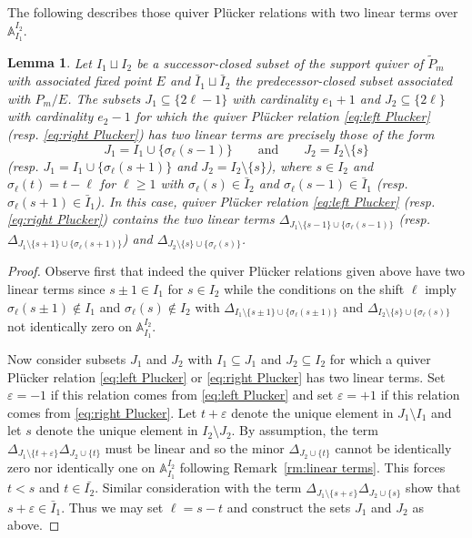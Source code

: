 \documentclass{amsart}
\newtheorem{lemma}[theorem]{Lemma}
\numberwithin{equation}{section}
\renewcommand{\AA}{\mathbb{A}}
\begin{document}
  The following describes those quiver Pl\"ucker relations with two linear terms over $\AA_{I_1}^{I_2}$.
  \begin{lemma}
    Let $I_1\sqcup I_2$ be a successor-closed subset of the support quiver of $\tilde P_m$ with associated fixed point $E$ and $\bar{I}_1\sqcup\bar{I}_2$ the predecessor-closed subset associated with $P_m/E$.
    The subsets $J_1\subseteq\{2\ell-1\}$ with cardinality $e_1+1$ and $J_2\subseteq\{2\ell\}$ with cardinality $e_2-1$ for which the quiver Pl\"ucker relation \eqref{eq:left Plucker} (resp. \eqref{eq:right Plucker}) has two linear terms are precisely those of the form
    \[J_1=I_1\cup\{\sigma_\ell(s-1)\} \qquad \text{and} \qquad J_2=I_2\setminus\{s\}\]
    (resp. $J_1=I_1\cup\{\sigma_\ell(s+1)\}$ and $J_2=I_2\setminus\{s\}$), where $s\in I_2$ and $\sigma_\ell(t)=t-\ell$ for $\ell\ge1$ with $\sigma_\ell(s)\in\bar{I}_2$ and $\sigma_\ell(s-1)\in\bar{I}_1$ (resp. $\sigma_\ell(s+1)\in\bar{I}_1$).
    In this case, quiver Pl\"ucker relation \eqref{eq:left Plucker} (resp. \eqref{eq:right Plucker}) contains the two linear terms $\Delta_{J_1\setminus\{s-1\}\cup\{\sigma_\ell(s-1)\}}$ (resp. $\Delta_{J_1\setminus\{s+1\}\cup\{\sigma_\ell(s+1)\}}$) and $\Delta_{J_2\setminus\{s\}\cup\{\sigma_\ell(s)\}}$.
  \end{lemma}
  \begin{proof}
    Observe first that indeed the quiver Pl\"ucker relations given above have two linear terms since $s\pm1\in I_1$ for $s\in I_2$ while the conditions on the shift $\ell$ imply $\sigma_\ell(s\pm1)\notin I_1$ and $\sigma_\ell(s)\notin I_2$ with $\Delta_{I_1\setminus\{s\pm1\}\cup\{\sigma_\ell(s\pm1)\}}$ and $\Delta_{I_2\setminus\{s\}\cup\{\sigma_\ell(s)\}}$ not identically zero on $\AA_{I_1}^{I_2}$.

    Now consider subsets $J_1$ and $J_2$ with $I_1\subseteq J_1$ and $J_2\subseteq I_2$ for which a quiver Pl\"ucker relation \eqref{eq:left Plucker} or \eqref{eq:right Plucker} has two linear terms.
    Set $\varepsilon=-1$ if this relation comes from \eqref{eq:left Plucker} and set $\varepsilon=+1$ if this relation comes from \eqref{eq:right Plucker}.
    Let $t+\varepsilon$ denote the unique element in $J_1\setminus I_1$ and let $s$ denote the unique element in $I_2\setminus J_2$.
    By assumption, the term $\Delta_{J_1\setminus\{t+\varepsilon\}} \Delta_{J_2\cup\{t\}}$ must be linear and so the minor $\Delta_{J_2\cup\{t\}}$ cannot be identically zero nor identically one on $\AA_{I_1}^{I_2}$ following Remark~\ref{rm:linear terms}.
    This forces $t<s$ and $t\in\bar{I_2}$.
    Similar consideration with the term $\Delta_{J_1\setminus\{s+\varepsilon\}} \Delta_{J_2\cup\{s\}}$ show that $s+\varepsilon\in\bar{I}_1$.
    Thus we may set $\ell=s-t$ and construct the sets $J_1$ and $J_2$ as above.
  \end{proof}
\end{document}
